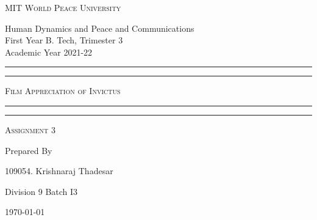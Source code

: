 \documentclass[11pt]{article}
\begin{document}
	
	\begin{titlepage} 
		\centering 
		
		
		\huge\textsc{
			MIT World Peace University
		}\\
	
		\vspace{0.75\baselineskip} %
		
		\LARGE{
			Human Dynamics and Peace and Communications\\
			First Year B. Tech, Trimester 3\\
			Academic Year 2021-22
		}
		
		\vfill %
		
		
		\rule{\textwidth}{1.6pt}\vspace*{-\baselineskip}\vspace*{2pt}
		\rule{\textwidth}{0.6pt}
		\vspace{0.75\baselineskip} %
		
		
		
		\huge{\textsc{
				Film Appreciation of Invictus
			}} \\
		
		
		
		\vspace{0.5\baselineskip} %
		\rule{\textwidth}{0.6pt}\vspace*{-\baselineskip}\vspace*{2.8pt}
		\rule{\textwidth}{1.6pt}
		
		\vspace{1\baselineskip} %

			
		\LARGE\textsc{
			Assignment 3
		} %
		\vfill
		
		
		Prepared By
		\vspace{0.5\baselineskip} %
		
		\Large{
			109054. Krishnaraj Thadesar
						
			Division 9 Batch I3
		}
		
		
		\vspace{0.5\baselineskip} %
		\today

	\end{titlepage}
\end{document}
